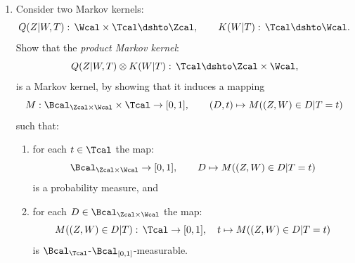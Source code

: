 \begin{enumerate}
\begin{gradedsolution}
\begin{enumerate}
\begin{align*}
        K := \mat{K_{zz} & K_{zw} \\ K_{wz} & K_{ww}} := \mat{\Gamma + C \Sigma C^T & C\Sigma \\ \Sigma C^T & \Sigma}.
      \end{align*}
      \item {} From (a) we can read off that:
      \[p(z|t) = \mathcal{N}(z|\mu_z, K_{zz}) = \mathcal{N}(z|C At + Cb + d, \Gamma + C \Sigma C^T)\]
      \item {} From (a) and e.g.\ \href{https://en.wikipedia.org/wiki/Multivariate_normal_distribution}{wikipedia} or Bishop - \emph{Pattern Recognition and Machine Learning}, Section 2.3.1, we deduce that
      \begin{align*}
        &p(w|z, t) = \Ncal(w|\mu_w + K_{wz}K_{zz}^{-1}(z - \mu_z), K_{ww} - K_{wz}K_{zz}^{-1}K_{zw})\\
        &= \Ncal(w|At+b + \Sigma C^T(\Gamma + C\Sigma C^T)^{-1}(z-C(At+b) - d), \Sigma - \Sigma C^T(\Gamma + C\Sigma C^T)^{-1}C\Sigma).
      \end{align*}
    \end{enumerate}
  \end{gradedsolution}

  \item Consider two Markov kernels:
  \begin{equation*}
    Q(Z|W,T):\, \Wcal\times \Tcal \dshto \Zcal,\qquad
    K(W|T):\, \Tcal \dshto \Wcal.
  \end{equation*}
  Show that the \emph{product Markov kernel}:
  \begin{equation*}
    Q(Z|W,T) \otimes K(W|T) :\, \Tcal \dshto \Zcal \times \Wcal,
  \end{equation*}
  is a Markov kernel, by showing that it induces a mapping
  \begin{equation*}
    M: \Bcal_{\Zcal \times \Wcal}\times \Tcal \to [0,1], \qquad (D, t) \mapsto M((Z, W)\in D|T=t)
  \end{equation*}
  such that:
  \begin{enumerate}[label=\roman*)]
      \item for each $t \in \Tcal$ the map:
      \[ \Bcal_{\Zcal \times \Wcal} \to [0,1],\qquad D \mapsto M((Z,W)\in D|T=t)\]
      is a probability measure, and
      \item for each $D \in \Bcal_{\Zcal \times \Wcal}$ the map:
      \[ M((Z,W) \in D|T):\, \Tcal \to [0,1],\quad t \mapsto M((Z, W) \in D|T=t) \]
      is $\Bcal_\Tcal$-$\Bcal_{[0,1]}$-measurable.
  \end{enumerate}



\end{enumerate}


